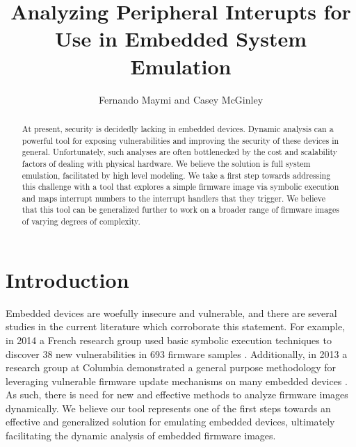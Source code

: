 \documentclass[letterpaper, 11 pt, conference]{ieeeconf}
\title{\LARGE \bf
Analyzing Peripheral Interupts for Use in Embedded System Emulation
}
\author{Fernando Maymi and Casey McGinley}
\begin{document}
\maketitle
\thispagestyle{empty}
\pagestyle{empty}

\begin{abstract}
At present, security is decidedly lacking in embedded devices. Dynamic analysis can a powerful tool for exposing vulnerabilities and improving the security of these devices in general. Unfortunately, such analyses are often bottlenecked by the cost and scalability factors of dealing with physical hardware. We believe the solution is full system emulation, facilitated by high level modeling. We take a first step towards addressing this challenge with a tool that explores a simple firmware image via symbolic execution and maps interrupt numbers to the interrupt handlers that they trigger. We believe that this tool can be generalized further to work on a broader range of firmware images of varying degrees of complexity.
\end{abstract}

\section{Introduction}\label{intro}
Embedded devices are woefully insecure and vulnerable, and there are several studies in the current literature which corroborate this statement. For example, in 2014 a French research group used basic symbolic execution techniques to discover 38 new vulnerabilities in 693 firmware samples \cite{acostin}. Additionally, in 2013 a research group at Columbia demonstrated a general purpose methodology for leveraging vulnerable firmware update mechanisms on many embedded devices \cite{acui}. As such, there is need for new and effective methods to analyze firmware images dynamically. We believe our tool represents one of the first steps towards an effective and generalized solution for emulating embedded devices, ultimately facilitating the dynamic analysis of embedded firmware images.
\end{document}

